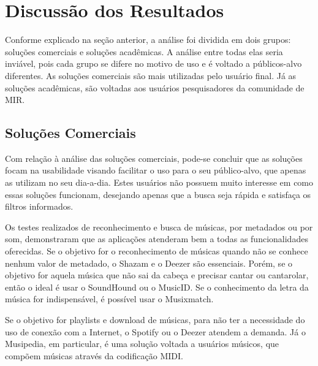 \section{Discussão dos Resultados} \label{sec:resultados}

Conforme explicado na seção anterior, a análise foi dividida em dois grupos: soluções comerciais e soluções acadêmicas. A análise entre todas elas seria inviável, pois cada grupo se difere no motivo de uso e é voltado a públicos-alvo diferentes. As soluções comerciais são mais utilizadas pelo usuário final. Já as soluções acadêmicas, são voltadas aos usuários pesquisadores da comunidade de MIR.


\subsection{Soluções Comerciais}

Com relação à análise das soluções comerciais, pode-se concluir que as soluções focam na usabilidade visando facilitar o uso para o seu público-alvo, que apenas as utilizam no seu dia-a-dia. Estes usuários não possuem muito interesse em como essas soluções funcionam, desejando apenas que a busca seja rápida e satisfaça os filtros informados.


Os testes realizados de reconhecimento e busca de músicas, por metadados ou por som, demonstraram que as aplicações atenderam bem a todas as funcionalidades oferecidas. Se o objetivo for o reconhecimento de músicas quando não se conhece nenhum valor de metadado, o Shazam e o Deezer são essenciais. Porém, se o objetivo for aquela música que não sai da cabeça e precisar cantar ou cantarolar, então o ideal é usar o SoundHound ou o MusicID. Se o conhecimento da letra da música for indispensável, é possível usar o Musixmatch.


Se o objetivo for playlists e download de músicas, para não ter a necessidade do uso de conexão com a Internet, o Spotify ou o Deezer atendem a demanda. Já o Musipedia, em particular, é uma solução voltada a usuários músicos, que compõem músicas através da codificação MIDI.

